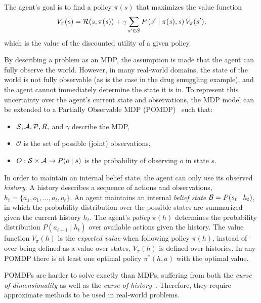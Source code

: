 \documentclass[conference]{IEEEtran}
\begin{document}

The agent's goal is to find a policy $\pi(s)$ that maximizes the value function
\begin{equation}
V_{\pi}(s) = \R(s,\pi(s)) + \gamma\sum\limits_{s^\prime\in\S}P\left(s^\prime\mid\pi(s),s\right)V_{\pi}(s^\prime),
\end{equation} 
which is the value of the discounted utility of a given policy.

By describing a problem as an MDP, the assumption is made that the agent can fully observe the world. However, in many real-world domains, the state of the world is not fully observable (as is the case in the drug smuggling example), and the agent cannot immediately determine the state it is in. To represent this uncertainty over the agent's current state and observations, the MDP model can be extended to a Partially Observable MDP (POMDP)~\cite{aastrom1965optimal,pomdp} such that: 

\begin{itemize}
\item $\S,\mathcal{A},\P,R,$ and $\gamma$ describe the MDP,
\item $\mathcal{O}$ is the set of possible (joint) observations,
\item $O:\S\times\mathcal{A}\to P(o\mid s)$ is the probability of observing $o$ in state $s$. 
\end{itemize}

In order to maintain an internal belief state, the agent can only use its observed \emph{history}. A history describes a sequence of actions and observations, $h_t = \{a_1, o_1, \ldots, a_t, o_t\}$. An agent maintains an internal {\it belief state} $\B = P(s_t\mid  h_t)$, in which the probability distribution over the possible states are summarized given the current history $h_t$. The agent's \emph{policy} $\pi(h)$ determines the probability distribution $P(a_{t+1}\mid h_t)$ over available actions given the history. The value function $V_{\pi}(h)$ is the {\it expected value} when following policy $\pi(h)$, instead of over being defined as a value over states, $V_{\pi}(h)$ is defined over histories. In any POMDP there is at least one optimal policy $\pi^*(h, a)$ with the optimal value.

POMDPs are harder to solve exactly than MDPs, suffering from both the {\it curse of dimensionality} as well as the {\it curse of history}~\cite{pineau2006anytime}. Therefore, they require approximate methods to be used in real-world problems.
\end{document}
